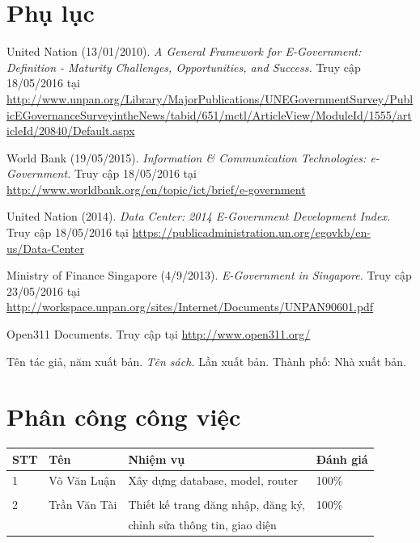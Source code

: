 \documentclass[a4paper]{article}
\begin{document}
\newpage
\section{Phụ lục}
\begin{thebibliography}{99}
United Nation (13/01/2010). \textit{A General Framework for E-Government: Definition - Maturity Challenges, Opportunities, and Success.} Truy cập 18/05/2016 tại \url{http://www.unpan.org/Library/MajorPublications/UNEGovernmentSurvey/PublicEGovernanceSurveyintheNews/tabid/651/mctl/ArticleView/ModuleId/1555/articleId/20840/Default.aspx}

World Bank (19/05/2015). \textit{Information \& Communication Technologies: e-Government.} Truy cập 18/05/2016 tại \url{http://www.worldbank.org/en/topic/ict/brief/e-government}

United Nation (2014). \textit{Data Center: 2014 E-Government Development Index.} Truy cập 18/05/2016 tại \url{https://publicadministration.un.org/egovkb/en-us/Data-Center}

Ministry of Finance Singapore (4/9/2013). \textit{E-Government in Singapore.} Truy cập 23/05/2016 tại \url{http://workspace.unpan.org/sites/Internet/Documents/UNPAN90601.pdf}

Open311 Documents. Truy cập tại
 \url{http://www.open311.org/} 

\bibitem{}
Tên tác giả, năm xuất bản. \textit{Tên sách.} Lần xuất bản. Thành phố: Nhà xuất bản.

\end{thebibliography}

\newpage
\section*{Phân công công việc}

    \begin{center}
        \begin{table}[h]
            \begin{tabular}{|l|l|l|l|}
            \hline
            STT & Tên & Nhiệm vụ & Đánh giá\\
            \hline
            1 & Võ Văn Luận & Xây dựng database, model, router & 100\%\\
              & &         & \\
            \hline
            2 & Trần Văn Tài & Thiết kế trang đăng nhập, đăng ký, & 100\%\\
              & & chỉnh sửa thông tin, giao diện &\\
            \hline
            \end{tabular}
        \end{table}    
    \end{center}

\listoffigures
\newpage
\end{document}
